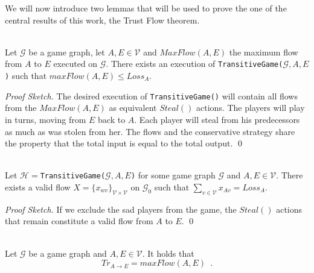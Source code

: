 \documentclass[11pt]{llncs}
\theoremstyle{definition}
\newenvironment{proofsketch}{\textit{Proof Sketch.}}{\qed \smallskip \ \\}
\begin{document}
    We will now introduce two lemmas that will be used to prove the one of the central results of this work, the Trust Flow
    theorem.
    \begin{lemma} \ \\
       \label{maxflowgame}
       Let $\mathcal{G}$ be a game graph, let $A, E \in \mathcal{V}$ and $MaxFlow\left(A, E\right)$ the maximum flow from
       $A$ to $E$ executed on $\mathcal{G}$. There exists an execution of
       \texttt{TransitiveGame(}$\mathcal{G}, A, E$\texttt{)} such that $maxFlow\left(A, E\right) \leq Loss_A$.
    \end{lemma}
    \begin{proofsketch}
       The desired execution of \texttt{TransitiveGame()} will contain all flows from the $MaxFlow\left(A, E\right)$ as
       equivalent $Steal\left(\right)$ actions. The players will play in turns, moving from $E$ back to $A$. Each player will
       steal from his predecessors as much as was stolen from her. The flows and the conservative strategy share the property
       that the total input is equal to the total output.
    \end{proofsketch}
    \begin{lemma} \ \\
       \label{gameflow}
       Let $\mathcal{H} = $\texttt{TransitiveGame(}$\mathcal{G}, A, E$\texttt{)} for some game graph $\mathcal{G}$ and $A,
       E \in \mathcal{V}$. There exists a valid flow
       $X = \{x_{wv}\}_{\mathcal{V} \times \mathcal{V}}$ on $\mathcal{G}_0$ such that
       $\sum\limits_{v \in \mathcal{V}}x_{Av} = Loss_A$.
    \end{lemma}
    \begin{proofsketch}
       If we exclude the sad players from the game, the $Steal\left(\right)$ actions that remain constitute a valid flow from
       $A$ to $E$.
    \end{proofsketch}
    \begin{theorem} \ \\
       \label{trustflow}
       Let $\mathcal{G}$ be a game graph and $A, E \in \mathcal{V}$. It holds that
       \begin{equation*}
          Tr_{A \rightarrow E} = maxFlow\left(A, E\right) \enspace.
       \end{equation*}
    \end{theorem}
\end{document}
